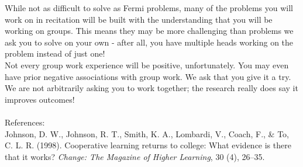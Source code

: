 \documentclass{ximera}
\begin{document}
While not as difficult to solve as Fermi problems, many of the problems you will work on in recitation will be built with the understanding that you will be working on groups.  This means they may be more challenging than problems we ask you to solve on your own - after all, you have multiple heads working on the problem instead of just one!    \\

Not every group work experience will be positive, unfortunately.  You may even have prior negative associations with group work.  We ask that you give it a try.  We are not arbitrarily asking you to work together; the research really does say it improves outcomes!  \\
\\
References:\\
Johnson, D. W., Johnson, R. T., Smith, K. A., Lombardi, V., Coach, F., \& To, C.
L. R. (1998). Cooperative learning returns to college: What evidence is there
that it works? \textit{Change: The Magazine of Higher Learning}, 30 (4), 26–35.
\end{document}
